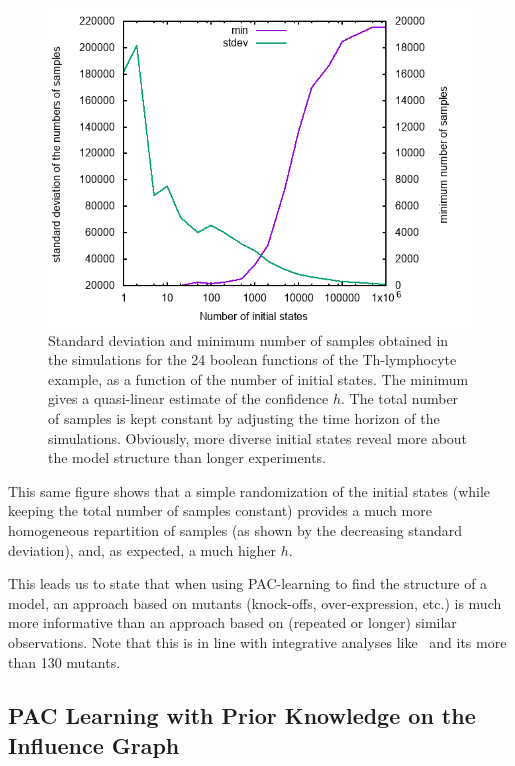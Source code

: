 \documentclass{llncs}
\begin{document}
\begin{figure}[htb]
   \includegraphics[width=\textwidth]{statistics/statistics.png}
   \caption{Standard deviation and minimum number of
   samples obtained in the simulations for the 24 boolean functions of the Th-lymphocyte example, as a function of the number of initial states. The
minimum gives a quasi-linear estimate of the confidence $h$. The total 
number of samples is kept constant by adjusting the
time horizon of the simulations. Obviously, more diverse initial states %
reveal more about the model structure than longer experiments.}%
\label{fig:statistics}
\end{figure}

This same figure shows that a simple randomization of
the initial states (while keeping the total number of samples constant)
provides a much more homogeneous repartition of samples (as shown by the
decreasing standard deviation), and, as expected, a much higher $h$.

This leads us to state that when using PAC-learning to find the structure of a
model, an approach based on mutants (knock-offs, over-expression, etc.) is
much more informative than an approach based on (repeated or longer) similar
observations. Note that this is in line with integrative analyses
like~\cite{CCCCNT04mbc} and its more than 130 mutants.


\subsection{PAC Learning with Prior Knowledge on the Influence Graph}
\label{sec:prior}
\end{document}
